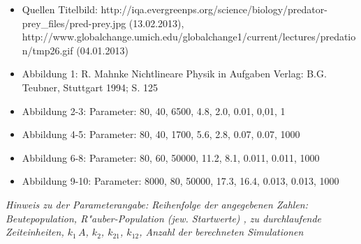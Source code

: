 \documentclass[11pt]{article}
\begin{document}
\begin{itemize}
   \item Quellen Titelbild: http://iqa.evergreenps.org/science/biology/predator-prey\_files/pred-prey.jpg (13.02.2013), http://www.globalchange.umich.edu/globalchange1/current/lectures/predation/tmp26.gif (04.01.2013)
   \item Abbildung 1: R. Mahnke \glqq Nichtlineare Physik in Aufgaben \grqq Verlag: B.G. Teubner, Stuttgart 1994; S. 125
   \item Abbildung 2-3: Parameter: 80, 40, 6500, 4.8, 2.0, 0.01, 0,01, 1
   \item Abbildung 4-5: Parameter: 80, 40, 1700, 5.6, 2.8, 0.07, 0.07, 1000
   \item Abbildung 6-8: Parameter: 80, 60, 50000, 11.2, 8.1, 0.011, 0.011, 1000
   \item Abbildung 9-10: Parameter: 8000, 80, 50000, 17.3, 16.4, 0.013, 0.013, 1000
\end{itemize}
\textit{Hinweis zu der Parameterangabe: Reihenfolge der angegebenen Zahlen:\\
 Beutepopulation, R"auber-Population (jew. Startwerte) , zu durchlaufende Zeiteinheiten, $k_1\,A$, $k_2$, $k_{21}$, $k_{12}$, Anzahl der berechneten Simulationen}
\end{document}
